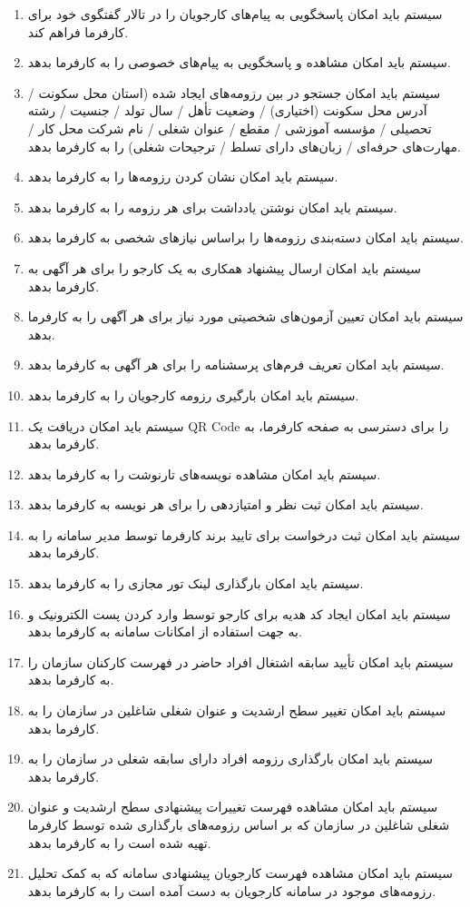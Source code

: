 \documentclass[12pt]{article}
\begin{document}
\begin{itemize}
\begin{enumerate}
			\item سیستم باید امکان پاسخگویی به پیام‌های کارجویان را در تالار گفتگوی خود برای کارفرما فراهم کند.
			\item سیستم باید امکان مشاهده و پاسخگویی به پیام‌های خصوصی را به کارفرما بدهد.
			\item سیستم باید امکان جستجو در بین رزومه‌های ایجاد شده (استان محل سکونت / آدرس محل سکونت (اختیاری) / وضعیت تأهل / سال تولد / جنسیت /  رشته تحصیلی / مؤسسه آموزشی / مقطع / عنوان شغلی / نام شرکت محل کار / مهارت‌های حرفه‌ای / زبان‌های دارای تسلط / ترجیحات شغلی) را به کارفرما بدهد.
			\item سیستم باید امکان نشان کردن رزومه‌ها را به کارفرما بدهد.
			\item سیستم باید امکان نوشتن یادداشت برای هر رزومه را به کارفرما بدهد.
			\item سیستم باید امکان دسته‌بندی رزومه‌ها را براساس نیازهای شخصی به کارفرما بدهد.
			\item سیستم باید امکان ارسال پیشنهاد همکاری به یک کارجو را برای هر آگهی به کارفرما بدهد.
			\item سیستم باید امکان تعیین آزمون‌های شخصیتی مورد نیاز برای هر آگهی را به کارفرما بدهد.
			\item سیستم باید امکان تعریف فرم‌های پرسشنامه را برای هر آگهی به کارفرما بدهد.
			\item سیستم باید امکان بارگیری رزومه کارجویان را به کارفرما بدهد.
			\item سیستم باید امکان دریافت یک QR Code را برای دسترسی به صفحه کارفرما، به کارفرما بدهد.
			\item سیستم باید امکان مشاهده نویسه‌های تارنوشت را به کارفرما بدهد.
			\item سیستم باید امکان ثبت نظر و امتیازدهی را برای هر نویسه به کارفرما بدهد.
			\item سیستم باید امکان ثبت درخواست برای تایید برند کارفرما توسط مدیر سامانه را به کارفرما بدهد.
			\item سیستم باید امکان بارگذاری لینک تور مجازی را به کارفرما بدهد.
			\item سیستم باید امکان ایجاد کد هدیه برای کارجو توسط وارد کردن پست الکترونیک و به جهت استفاده از امکانات سامانه به کارفرما بدهد.
			\item سیستم باید امکان تأیید سابقه اشتغال افراد حاضر در فهرست کارکنان سازمان را به کارفرما بدهد.
			\item سیستم باید امکان تغییر سطح ارشدیت و عنوان شغلی شاغلین در سازمان را به کارفرما بدهد.
			\item سیستم باید امکان بارگذاری رزومه افراد دارای سابقه شغلی در سازمان را به کارفرما بدهد.
			\item سیستم باید امکان مشاهده فهرست تغییرات پیشنهادی سطح ارشدیت و عنوان شغلی شاغلین در سازمان که بر اساس رزومه‌های بارگذاری شده توسط کارفرما تهیه شده است را به کارفرما بدهد.
			\item سیستم باید امکان مشاهده فهرست کارجویان پیشنهادی سامانه که به کمک تحلیل رزومه‌های موجود در سامانه کارجویان به دست آمده است را به کارفرما بدهد.
		\end{enumerate}
	\end{itemize}
\end{document}
